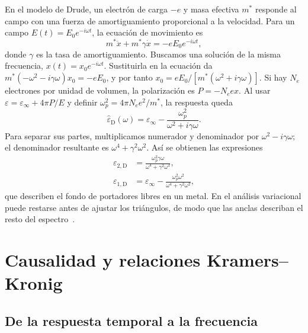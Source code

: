En el modelo de Drude, un electr\'on de carga $-e$ y masa efectiva $m^*$ responde al campo con una fuerza de amortiguamiento proporcional a la velocidad. Para un campo $E(t)=E_0e^{-i\omega t}$, la ecuaci\'on de movimiento es
\begin{equation}
m^*\ddot{x}+m^*\gamma\dot{x}=-eE_0e^{-i\omega t},
\end{equation}
donde $\gamma$ es la tasa de amortiguamiento. Buscamos una soluci\'on de la misma frecuencia, $x(t)=x_0e^{-i\omega t}$. Sustituirla en la ecuaci\'on da $m^*(-\omega^2-i\gamma\omega)x_0=-eE_0$, y por tanto $x_0=eE_0/[m^*(\omega^2+i\gamma\omega)]$.
Si hay $N_e$ electrones por unidad de volumen, la polarizaci\'on es $P=-N_e e x$. Al usar $\varepsilon=\varepsilon_\infty+4\pi P/E$ y definir $\omega_p^2=4\pi N_e e^2/m^*$, la respuesta queda
\begin{equation}
\hat\varepsilon_{\mathrm{D}}(\omega)=\varepsilon_\infty-\frac{\omega_p^2}{\omega^2+i\gamma\omega}.
\end{equation}
Para separar sus partes, multiplicamos numerador y denominador por $\omega^2-i\gamma\omega$; el denominador resultante es $\omega^4+\gamma^2\omega^2$. As\'i se obtienen las expresiones
\begin{align}
\label{eq:drude}
\varepsilon_{2,\mathrm{D}}&=\frac{\omega_p^{2}\gamma\omega}{\omega^{4}+\gamma^{2}\omega^{2}},\\
\varepsilon_{1,\mathrm{D}}&=\varepsilon_\infty-\frac{\omega_p^{2}\omega^{2}}{\omega^{4}+\gamma^{2}\omega^{2}},
\end{align}
que describen el fondo de portadores libres en un metal.
En el an\'alisis variacional puede restarse antes de ajustar los tri\'angulos, de modo que las anclas describan el resto del espectro~\cite{constrained}.


\chapter{Causalidad y relaciones Kramers--Kronig}
\label{ch:kk}

\section{De la respuesta temporal a la frecuencia}

